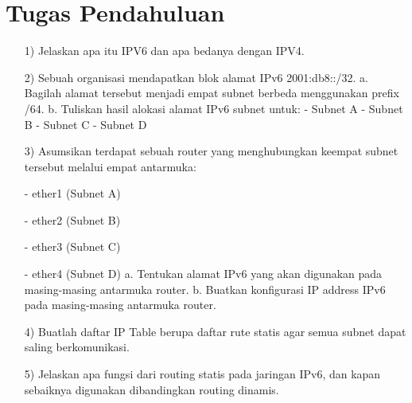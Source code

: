 \documentclass[12pt,a4paper]{article}
\begin{document}
\section{Tugas Pendahuluan}
\begin{itemize}
    \item[1)] Jelaskan apa itu IPV6 dan apa bedanya dengan IPV4.
    \item[2)] Sebuah organisasi mendapatkan blok alamat IPv6 2001:db8::/32. a. Bagilah alamat tersebut menjadi empat subnet berbeda menggunakan prefix /64. b. Tuliskan hasil alokasi alamat IPv6 subnet untuk: - Subnet A - Subnet B - Subnet C - Subnet D
    
    \item [3)]Asumsikan terdapat sebuah router yang menghubungkan keempat subnet tersebut melalui empat antarmuka:
    \item[-] ether1 (Subnet A)
    \item[-] ether2 (Subnet B)
    \item[-] ether3 (Subnet C)
    \item[-]  ether4 (Subnet D) a. Tentukan alamat IPv6 yang akan digunakan pada masing-masing antarmuka router. b. Buatkan konfigurasi IP address IPv6 pada masing-masing antarmuka router.
    
    \item[4)] Buatlah daftar IP Table berupa daftar rute statis agar semua subnet dapat saling berkomunikasi.
    
    \item[5)] Jelaskan apa fungsi dari routing statis pada jaringan IPv6, dan kapan sebaiknya digunakan dibandingkan routing dinamis.
\end{itemize}
\end{document}
